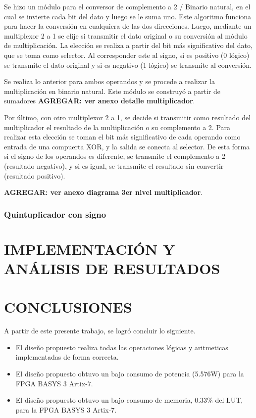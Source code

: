 \documentclass[journal,trans]{IEEEtran}
\begin{document}
Se hizo un módulo para el conversor de complemento a 2 / Binario natural, en el cual se invierte cada bit del dato y luego se le suma uno. Este algoritmo funciona para hacer la conversión en cualquiera de las dos direcciones. Luego, mediante un multiplexor 2 a 1 se elije si transmitir el dato original o su conversión al módulo de multiplicación. La elección se realiza a partir del bit más significativo del dato, que se toma como selector. Al corresponder este al signo, si es positivo (0 lógico) se transmite el dato original y si es negativo (1 lógico) se transmite al conversión.

Se realiza lo anterior para ambos operandos y se procede a realizar la multiplicación en binario natural. Este módulo se construyó a partir de sumadores \textbf{AGREGAR: ver anexo detalle multiplicador}.

Por último, con otro multiplexor 2 a 1, se decide si transmitir como resultado del multiplicador el resultado de la multiplicación o su complemento a 2. Para realizar esta elección se toman el bit más significativo de cada operando como entrada de una compuerta XOR, y la salida se conecta al selector. De esta forma si el signo de los operandos es diferente, se transmite el complemento a 2 (resultado negativo), y si es igual, se transmite el resultado sin convertir (resultado positivo).

\textbf{AGREGAR: ver anexo diagrama 3er nivel multiplicador}.


\subsubsection{Quintuplicador con signo}


\section{IMPLEMENTACIÓN Y ANÁLISIS DE RESULTADOS}


\section{CONCLUSIONES}
A partir de este presente trabajo, se logró concluir lo siguiente.
\begin{itemize}
    \item El diseño propuesto realiza todas las operaciones lógicas y aritmeticas implementadas de forma correcta.
    \item El diseño propuesto obtuvo un bajo consumo de potencia (5.576W) para la FPGA BASYS 3 Artix-7.
    \item El diseño propuesto obtuvo un bajo consumo de memoria, 0.33\% del LUT, para la FPGA BASYS 3 Artix-7.
\end{itemize}
\end{document}
